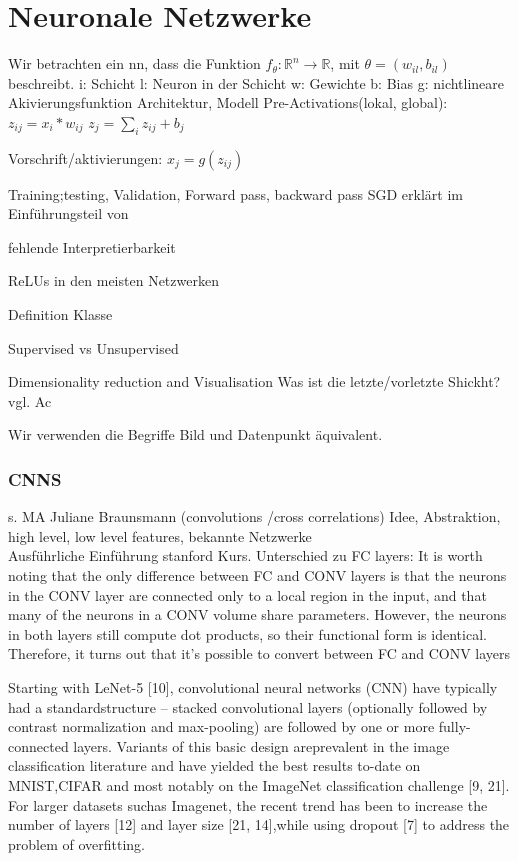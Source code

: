 \documentclass[11pt,a4paper]{article}
\numberwithin{equation}{section}
\begin{document}
	\section{Neuronale Netzwerke} \label{chapter_nn}
	Wir betrachten ein \gls{nn}, dass die Funktion $f_{\theta}:\mathbb{R}^n \to\mathbb{R}$, mit $\theta = (w_{il}, b_{il})$ beschreibt. 
	i: Schicht
	l: Neuron in der Schicht
	w: Gewichte 
	b: Bias
	g: nichtlineare Akivierungsfunktion
	Architektur,
	Modell
	Pre-Activations(lokal, global): $z_{ij} = x_i*w_{ij}$
	$z_j = \sum_iz_{ij} + b_j$
	
	Vorschrift/aktivierungen: $x_j = g(z_{ij})$
	
	
	Training;testing, Validation, Forward pass, backward pass
	SGD erklärt im Einführungsteil von \cite{BatchNormalization}
	
	fehlende Interpretierbarkeit
	
	ReLUs in den meisten Netzwerken
	
	Definition Klasse
	
	Supervised vs Unsupervised
	
	Dimensionality reduction and Visualisation
	Was ist die letzte/vorletzte Shickht? vgl. Ac
	
	Wir verwenden die Begriffe Bild und Datenpunkt äquivalent.
	\subsubsection{CNNS}
	s. MA Juliane Braunsmann (convolutions /cross correlations)
	Idee, Abstraktion, high level, low level features, bekannte Netzwerke\\
	
	Ausführliche Einführung stanford Kurs\cite{cnn_stanford}. Unterschied zu FC layers: 
	It is worth noting that the only difference between FC and CONV layers is that the neurons in the CONV layer are connected only to a local region in the input, and that many of the neurons in a CONV volume share parameters. However, the neurons in both layers still compute dot products, so their functional form is identical. Therefore, it turns out that it’s possible to convert between FC and CONV layers
	
	Starting with LeNet-5   [10], convolutional neural networks (CNN) have typically had a standardstructure – stacked convolutional layers (optionally followed by contrast normalization and max-pooling)  are  followed  by  one  or  more  fully-connected  layers.   Variants  of  this  basic  design  areprevalent in the image classification literature and have yielded the best results to-date on MNIST,CIFAR and most notably on the ImageNet classification challenge [9, 21].  For larger datasets suchas Imagenet, the recent trend has been to increase the number of layers  [12] and layer size [21, 14],while using dropout [7] to address the problem of overfitting.\cite{goingdeeperwithconvolutions}
	
\end{document}
